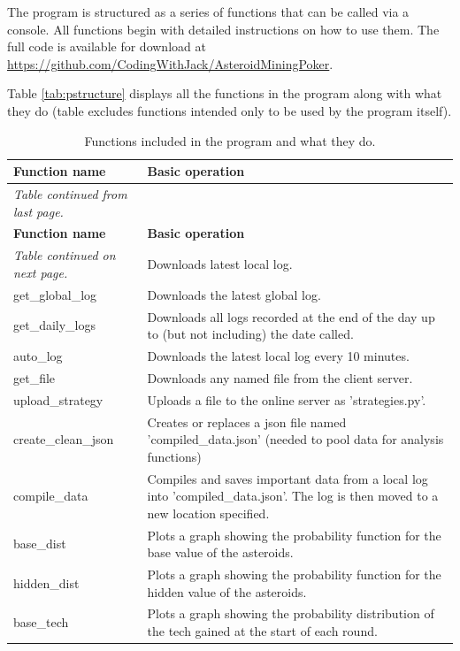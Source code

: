 \documentclass[11pt, twoside]{article}
\begin{document}
The program is structured as a series of functions that can be called via a console. All functions begin with detailed instructions on how to use them. The full code is available for download at \url{https://github.com/CodingWithJack/AsteroidMiningPoker}.

Table \ref{tab:pstructure} displays all the functions in the program along with what they do (table excludes functions intended only to be used by the program itself).

\begin{longtable}{p{}p{}}
	\caption{Functions included in the program and what they do.}\\
	\toprule \textbf{Function name} & \textbf{Basic operation} \\ \midrule
	\endfirsthead
	\multicolumn{1}{l}{\textit{Table continued from last page.}}\\
	\toprule \textbf{Function name} & \textbf{Basic operation} \\ \midrule \endhead
	\bottomrule \multicolumn{1}{l}{\textit{Table continued on next page.}} \endfoot
	\bottomrule \endlastfoot
	get\_local\_log & Downloads latest local log. \\
	get\_global\_log & Downloads the latest global log. \\
	get\_daily\_logs & Downloads all logs recorded at the end of the day up to (but not including) the date called. \\
	auto\_log & Downloads the latest local log every 10 minutes. \\
	get\_file & Downloads any named file from the client server. \\
	upload\_strategy & Uploads a file to the online server as 'strategies.py'. \\
	create\_clean\_json & Creates or replaces a json file named 'compiled\_data.json' (needed to pool data for analysis functions) \\
	compile\_data & Compiles and saves important data from a local log into 'compiled\_data.json'. The log is then moved to a new location specified. \\
	base\_dist & Plots a graph showing the probability function for the base value of the asteroids. \\
	hidden\_dist & Plots a graph showing the probability function for the hidden value of the asteroids. \\
	base\_tech & Plots a graph showing the probability distribution of the tech gained at the start of each round. \\

\end{longtable}
\end{document}
